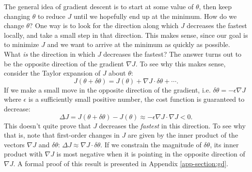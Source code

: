 \documentclass{article}
\theoremstyle{definition}
\begin{document}
The general idea of gradient descent is to start at some value of $\theta$, then keep changing $\theta$ to reduce $J$ until we hopefully end up at the minimum. How do we change $\theta$? One way is to look for the direction along which $J$ decreases the fastest locally, and take a small step in that direction. This makes sense, since our goal is to minimize $J$ and we want to arrive at the minimum as quickly as possible. What \textit{is} the direction in which $J$ decreases the fastest? The answer turns out to be the opposite direction of the gradient $\nabla J$. To see why this makes sense, consider the Taylor expansion of $J$ about $\theta$:
\begin{equation}
    J(\theta + \delta\theta) =  J(\theta) + \nabla J \cdot \delta\theta + \cdots.
\end{equation}
If we make a small move in the opposite direction of the gradient, i.e. $\delta\theta = -\epsilon \nabla J$ where $\epsilon$ is a sufficiently small positive number, the cost function is guaranteed to decrease:
\begin{equation}
   \Delta J = J(\theta + \delta\theta) -  J(\theta) \approx -\epsilon \nabla J \cdot \nabla J < 0.
\end{equation}
This doesn't quite prove that $J$ decreases the \textit{fastest} in this direction. To see why that is, note that first-order changes in $J$ are given by the inner product of the vectors $\nabla J$ and $\delta \theta$: $\Delta J \approx \nabla J \cdot \delta\theta$. If we constrain the magnitude of $\delta \theta$, its inner product with $\nabla J$ is most negative when it is pointing in the opposite direction of $\nabla J$. A formal proof of this result is presented in Appendix \ref{app-section:gd}.
\end{document}
